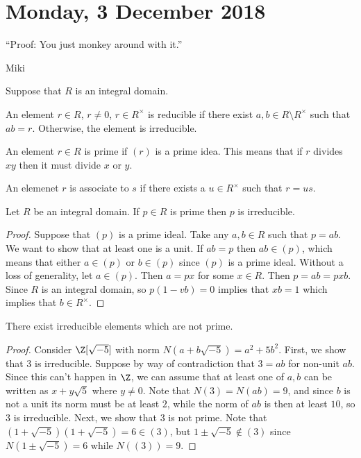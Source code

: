 \section{Monday, 3 December 2018}

\epigraph{``Proof: You just monkey around with it.''}{Miki}

Suppose that $R$ is an integral domain.

\begin{definition}[Reducible]
 An element $r \in R$, $r \not= 0$, $r \in R^\times$ is reducible if there exist $a,b \in R \setminus R^\times$ such that $ab = r$. Otherwise, the element is irreducible.
\end{definition}

\begin{definition}
An element $r \in R$ is prime if $(r)$ is a prime idea. This means that if $r$ divides $xy$ then it must divide $x$ or $y$.
\end{definition}

\begin{definition}
An elemenet $r$ is associate to $s$ if there exists a $u \in R^\times$ such that $r=us$.
\end{definition}

\begin{proposition}
Let $R$ be an integral domain. If $p \in R$ is prime then $p$ is irreducible.
\end{proposition}

\begin{proof}
Suppose that $(p)$ is a prime ideal. Take any $a,b \in R$ such that $p = ab$. We want to show that at least one is a unit. If $ab = p$ then $ab \in (p)$, which means that either $a \in (p)$ or $b \in (p)$ since $(p)$ is a prime ideal. Without a loss of generality, let $a \in (p)$. Then $a = px$ for some $x \in R$. Then $p = ab = pxb$. Since $R$ is an integral domain, so $p(1-vb) = 0$ implies that $xb = 1$ which implies that $b \in R^\times$. 
\end{proof}

\begin{proposition}
There exist irreducible elements which are not prime.
\end{proposition}

\begin{proof}
Consider $\Z[\sqrt{-5}]$ with norm $N(a+b\sqrt{-5}) = a^2 + 5b^2$. First, we show that $3$ is irreducible. Suppose by way of contradiction that $3=ab$ for non-unit $ab$. Since this can't happen in $\Z$, we can assume that at least one of $a,b$ can be written as $x + y\sqrt{5}$ where $y \not=0$. Note that $N(3) = N(ab) = 9$, and since $b$ is not a unit its norm must be at least $2$, while the norm of $ab$ is then at least $10$, so $3$ is irreducible. Next, we show that $3$ is not prime. Note that $(1+\sqrt{-5})(1+\sqrt{-5}) = 6 \in (3)$, but $1 \pm \sqrt{-5} \notin (3)$ since $N(1 \pm \sqrt{-5}) = 6$ while $N((3)) = 9$.
\end{proof}

